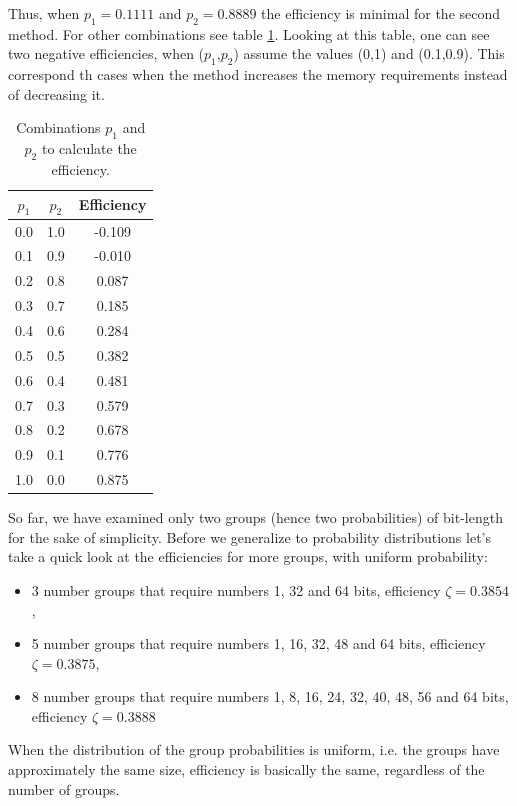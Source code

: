\documentclass[10pt]{article}
\begin{document}
Thus, when $p_1=0.1111$ and $p_2=0.8889$ the efficiency is minimal for the second method. For other combinations see table \ref{tab:02}. Looking at this table, one can see two negative efficiencies, when ($p_1$,$p_2$) assume the values ​​(0,1) and (0.1,0.9). This correspond th cases when the method increases the memory requirements instead of decreasing it.

\begin{table}[h]
 \centering
 \caption{Combinations $p_1$ and $p_2$ to calculate the efficiency.}
 \begin{tabular}{ccc}
  \hline 
  $p_1$  & $p_2$ & Efficiency \\
  \hline
  0.0	&1.0    &-0.109 \\
  0.1	&0.9	&-0.010 \\
  0.2	&0.8	&0.087 \\
  0.3	&0.7	&0.185 \\
  0.4	&0.6	&0.284 \\
  0.5	&0.5	&0.382 \\
  0.6	&0.4	&0.481 \\
  0.7	&0.3	&0.579 \\ 
  0.8	&0.2	&0.678 \\
  0.9	&0.1	&0.776 \\ 
  1.0	&0.0	&0.875 \\
  \hline
 \end{tabular}
 \label{tab:02}
\end{table}

So far, we have examined only two groups (hence two probabilities) of bit-length for the sake of simplicity. Before we generalize to probability distributions let's take a quick look at the efficiencies for more groups, with uniform probability:

\begin{itemize}
  \item 3 number groups that require numbers 1, 32 and 64 bits, efficiency $\zeta=0.3854$,
  \item 5 number groups that require numbers 1, 16, 32, 48 and 64 bits, efficiency $\zeta=0.3875$,
  \item 8 number groups that require numbers 1, 8, 16, 24, 32, 40, 48, 56 and 64 bits, efficiency $\zeta=0.3888$
\end{itemize}

When the distribution of the group probabilities is uniform, i.e. the groups have approximately the same size, efficiency is basically the same, regardless of the number of groups.
\end{document}
